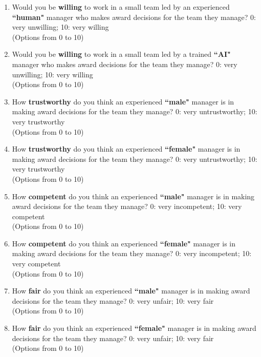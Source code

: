 \begin{enumerate}
    \item Would you be \textbf{willing} to work in a small team led by an experienced \textbf{``human"} manager who makes award decisions for the team they manage? 0: very unwilling; 10: very willing
   \\ (Options from 0 to 10)
    
    \item Would you be \textbf{willing} to work in a small team led by a trained \textbf{``AI"} manager who makes award decisions for the team they manage? 0: very unwilling; 10: very willing
   \\ (Options from 0 to 10)
    
    \item How \textbf{trustworthy} do you think an experienced \textbf{``male"} manager is in making award decisions for the team they manage? 0: very untrustworthy; 10: very trustworthy
   \\ (Options from 0 to 10)
    
    \item How \textbf{trustworthy} do you think an experienced \textbf{``female"} manager is in making award decisions for the team they manage? 0: very untrustworthy; 10: very trustworthy
   \\ (Options from 0 to 10)
    
    \item How \textbf{competent} do you think an experienced \textbf{``male"} manager is in making award decisions for the team they manage? 0: very incompetent; 10: very competent
   \\ (Options from 0 to 10)
    
    \item How \textbf{competent} do you think an experienced \textbf{``female"} manager is in making award decisions for the team they manage? 0: very incompetent; 10: very competent
   \\ (Options from 0 to 10)
    
    \item How \textbf{fair} do you think an experienced \textbf{``male"} manager is in making award decisions for the team they manage? 0: very unfair; 10: very fair
   \\ (Options from 0 to 10)
    
    \item How \textbf{fair} do you think an experienced \textbf{``female"} manager is in making award decisions for the team they manage? 0: very unfair; 10: very fair
   \\ (Options from 0 to 10)
    

\end{enumerate}
